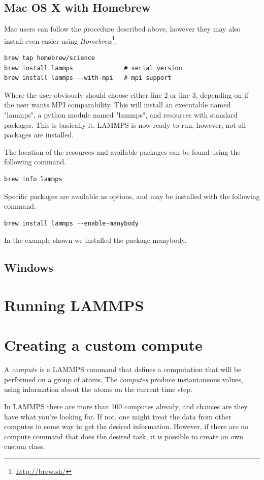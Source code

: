 \documentclass[twoside,english]{uiofysmaster}
\begin{document}
\subsection{Mac OS X with Homebrew}
Mac users can follow the procedure described above, however they may also install even easier using \textit{Homebrew}\footnote{\href{http://brew.sh/}{http://brew.sh/}}. 
\begin{lstlisting}
brew tap homebrew/science
brew install lammps              # serial version
brew install lammps --with-mpi   # mpi support 
\end{lstlisting}
Where the user obviously should choose either line 2 or line 3, depending on if the user wants MPI comparability.
This will install an executable named "lammps", a python module named "lammps", and resources with standard packages. 
This is basically it. LAMMPS is now ready to run, however, not all packages are installed.

The location of the resources and available packages can be found using the following command.
\begin{lstlisting}
brew info lammps 
\end{lstlisting}
Specific packages are available as options, and may be installed with the following command.

\begin{lstlisting}
brew install lammps --enable-manybody 
\end{lstlisting}
In the example shown we installed the package manybody.


\subsection{Windows}



\section{Running LAMMPS}




\section{Creating a custom compute}
A \textit{compute} is a LAMMPS command that defines a computation that will be performed on a group of atoms. The \textit{computes} produce instantaneous values, using information about the atoms on the current time step. 

In LAMMPS there are more than 100 computes already, and chances are they have what you're looking for. If not, one might treat the data from other computes in some way to get the desired information. However, if there are no compute command that does the desired task, it is possible to create an own custom class.  
\end{document}
